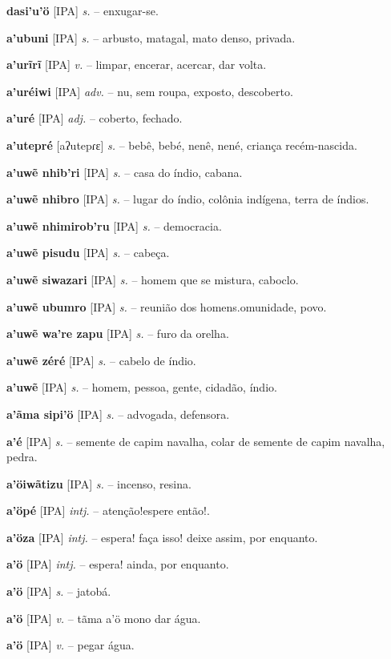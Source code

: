 \textbf{dasi'u'ö} [IPA] \textit{s.} -- enxugar-se.

\textbf{a'ubuni} [IPA] \textit{s.} -- arbusto, matagal, mato denso, privada.

\textbf{a'urĩrĩ} [IPA] \textit{v.} -- limpar, encerar, acercar, dar volta.

\textbf{a'uréiwi} [IPA] \textit{adv.} -- nu, sem roupa, exposto, descoberto.

\textbf{a'uré} [IPA] \textit{adj.} -- coberto, fechado.

\textbf{a'utepré} [aʔutepɾɛ] \textit{s.} -- bebê, bebé, nenê, nené, criança recém-nascida.

\textbf{a'uwẽ nhib'ri} [IPA] \textit{s.} -- casa do índio, cabana.

\textbf{a'uwẽ nhibro} [IPA] \textit{s.} -- lugar do índio, colônia indígena, terra de índios.

\textbf{a'uwẽ nhimirob'ru} [IPA] \textit{s.} -- democracia.

\textbf{a'uwẽ pisudu} [IPA] \textit{s.} -- cabeça.

\textbf{a'uwẽ siwazari} [IPA] \textit{s.} -- homem que se mistura, caboclo.

\textbf{a'uwẽ ubumro} [IPA] \textit{s.} -- reunião dos homens.omunidade, povo.

\textbf{a'uwẽ wa're zapu} [IPA] \textit{s.} -- furo da orelha.

\textbf{a'uwẽ zéré} [IPA] \textit{s.} -- cabelo de índio.

\textbf{a'uwẽ} [IPA] \textit{s.} -- homem, pessoa, gente, cidadão, índio.

\textbf{a'ãma sipi'ö} [IPA] \textit{s.} -- advogada, defensora.

\textbf{a'é} [IPA] \textit{s.} -- semente de capim navalha, colar de semente de capim navalha, pedra.

\textbf{a'öiwãtizu} [IPA] \textit{s.} -- incenso, resina.

\textbf{a'öpé} [IPA] \textit{intj.} -- atenção!espere então!.

\textbf{a'öza} [IPA] \textit{intj.} -- espera! faça isso! deixe assim, por enquanto.

\textbf{a'ö} [IPA] \textit{intj.} -- espera! ainda, por enquanto.

\textbf{a'ö} [IPA] \textit{s.} -- jatobá.

\textbf{a'ö} [IPA] \textit{v.} -- tãma a'ö mono dar água.

\textbf{a'ö} [IPA] \textit{v.} -- pegar água.

